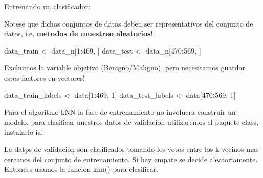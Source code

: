 \documentclass[ignorenonframetext,]{beamer}
\newenvironment{Shaded}{\begin{snugshade}}{\end{snugshade}}
\newcommand{\DecValTok}[1]{\textcolor[rgb]{0.00,0.00,0.81}{#1}}
\newcommand{\StringTok}[1]{\textcolor[rgb]{0.31,0.60,0.02}{#1}}
\newcommand{\OperatorTok}[1]{\textcolor[rgb]{0.81,0.36,0.00}{\textbf{#1}}}
\newcommand{\NormalTok}[1]{#1}
\begin{document}
\begin{frame}[fragile]

\begin{block}{Entrenando un clasificador:}

Notese que dichos conjuntos de datos deben ser representativos del
conjunto de datos, i.e. \textbf{metodos de muestreo aleatorios}!

\begin{Shaded}
\begin{Highlighting}[]
\NormalTok{data_train <-}\StringTok{ }\NormalTok{data_n[}\DecValTok{1}\OperatorTok{:}\DecValTok{469}\NormalTok{, ]}
\NormalTok{data_test  <-}\StringTok{ }\NormalTok{data_n[}\DecValTok{470}\OperatorTok{:}\DecValTok{569}\NormalTok{, ] }
\end{Highlighting}
\end{Shaded}

Excluimos la variable objetivo (Benigno/Maligno), pero necesitamos
guardar estos factores en vectores!

\begin{Shaded}
\begin{Highlighting}[]
\NormalTok{data_train_labels <-}\StringTok{ }\NormalTok{data[}\DecValTok{1}\OperatorTok{:}\DecValTok{469}\NormalTok{, }\DecValTok{1}\NormalTok{]}
\NormalTok{data_test_labels  <-}\StringTok{ }\NormalTok{data[}\DecValTok{470}\OperatorTok{:}\DecValTok{569}\NormalTok{, }\DecValTok{1}\NormalTok{]}
\end{Highlighting}
\end{Shaded}

Para el algoritmo kNN la fase de entrenamiento no involucra construir un
modelo, para clasificar nuestros datos de validacion utilizaremos el
paquete class, instalarlo ia!

La datps de validacion son clasificados tomando los votos entre los k
vecinos mas cercanos del conjunto de entrenamiento. Si hay empate se
decide aleatoriamente. Entonces usamos la funcion knn() para clasificar.

\end{block}

\end{frame}
\end{document}
